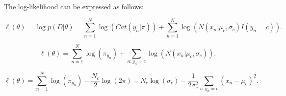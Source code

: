 \documentclass{article}
\begin{document}
The log-likelihood can be expressed as follows:

\[
\ell(\theta) = \log p(D | \theta) = \sum_{n=1}^N \log \left( Cat(y_n | \pi) \right) + \sum_{n=1}^N \log \left( N(x_n | \mu_c, \sigma_c) I(y_n = c) \right).
\]

\[
\ell(\theta) = \sum_{n=1}^N \log(\pi_{y_n}) + \sum_{n: y_n = c} \log \left( N(x_n | \mu_c, \sigma_c) \right).
\]









\[
\ell(\theta) = \sum_{n=1}^N \log(\pi_{y_n}) - \frac{N_c}{2} \log(2\pi) - N_c \log(\sigma_c) - \frac{1}{2\sigma_c^2} \sum_{n: y_n = c} (x_n - \mu_c)^2.
\]
\end{document}
